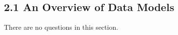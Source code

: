 \documentclass[../../main.tex]{subfiles}
\begin{document}
\subsection*{2.1 An Overview of Data Models}

There are no questions in this section.
\end{document}
